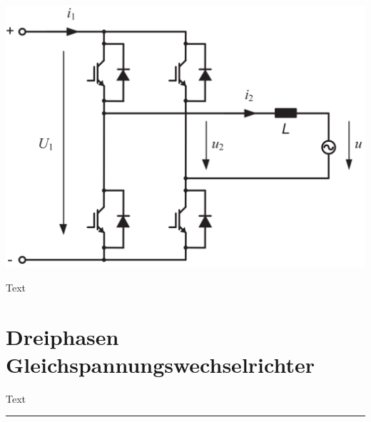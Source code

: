 \documentclass[10pt,landscape]{scrartcl}
\begin{document}
\begin{multicols}{2}
\begin{center}
\includegraphics[width=0.8\linewidth]{img/sch_fullbridge.png}%
\end{center}

Text

\vfill\null
\columnbreak
\section{Dreiphasen Gleichspannungswechselrichter}
Text

\clearpage

\rule{0.3\linewidth}{0.25pt}
%
%
\end{multicols}
\end{document}
